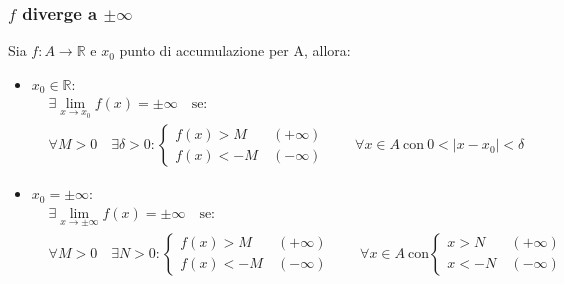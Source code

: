 \subsubsection{\texorpdfstring{$f$ diverge a $\pm\infty$}{}}
Sia $f:A\to\mathbb{R}$ e $x_0$ punto di accumulazione per A, allora:
\begin{itemize}
    \item $x_0\in\mathbb{R}$:
    \begin{equation}
        \begin{aligned}
            & \exists \lim_{x \to x_0} f(x) = \pm\infty \quad \text{se:} \\
            & \forall M > 0 \quad \exists\delta>0:
            \begin{cases}
                f(x)>M &(+\infty)\\ 
                f(x) < -M\ &(-\infty)
            \end{cases} \qquad
            \forall x\in A\ \text{con}\ 0 < |x-x_0| < \delta
        \end{aligned}
    \end{equation}
    
    \item $x_0 = \pm\infty$:
    \begin{equation}
        \begin{aligned}
            & \exists \lim_{x \to \pm\infty} f(x) = \pm\infty \quad \text{se:} \\
            & \forall M > 0 \quad \exists N>0:
            \begin{cases}
                f(x)>M &(+\infty)\\ 
                f(x) < -M\ &(-\infty)
            \end{cases} \qquad
            \forall x\in A\ \text{con}
            \begin{cases}
                x>N &(+\infty)\\ 
                x<-N\ &(-\infty)
            \end{cases}
        \end{aligned}
    \end{equation}
\end{itemize}

